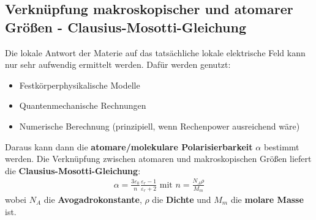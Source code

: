   \subsection{Verknüpfung makroskopischer und atomarer Größen - Clausius-Mosotti-Gleichung}
		   Die lokale Antwort der Materie auf das tatsächliche lokale elektrische Feld kann nur sehr aufwendig ermittelt werden. Dafür werden genutzt:
		        \begin{itemize}
			        \item Festkörperphysikalische Modelle
			        \item Quantenmechanische Rechnungen
			        \item Numerische Berechnung (prinzipiell, wenn Rechenpower ausreichend wäre)
		        \end{itemize}
		   Daraus kann dann die \textbf{atomare/molekulare Polarisierbarkeit} $\alpha$ bestimmt werden. Die Verknüpfung zwischen atomaren und makroskopischen Größen liefert die \textbf{Clausius-Mosotti-Gleichung}:
		        \begin{equation}\begin{split}
				        \boxed{\alpha = \frac{3\varepsilon_0}{n} \frac{\varepsilon_r -1}{\varepsilon_r +2} } \text{ mit } n=\frac{N_A\rho}{M_m}
			        \end{split}\end{equation}
		        wobei $N_A$ die \textbf{Avogadrokonstante}, $\rho$ die \textbf{Dichte} und $M_m$ die \textbf{molare Masse} ist.
